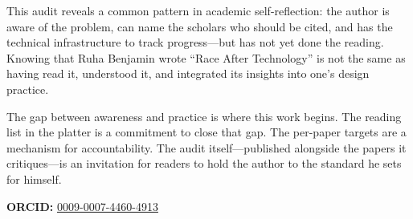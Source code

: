 \documentclass[10pt,letterpaper,twocolumn]{article}
\begin{document}
This audit reveals a common pattern in academic self-reflection: the author is aware of the problem, can name the scholars who should be cited, and has the technical infrastructure to track progress---but has not yet done the reading. Knowing that Ruha Benjamin wrote ``Race After Technology'' is not the same as having read it, understood it, and integrated its insights into one's design practice.

The gap between awareness and practice is where this work begins. The reading list in the platter is a commitment to close that gap. The per-paper targets are a mechanism for accountability. The audit itself---published alongside the papers it critiques---is an invitation for readers to hold the author to the standard he sets for himself.

\vspace{0.5em}
\noindent\textbf{ORCID:} \href{https://orcid.org/0009-0007-4460-4913}{0009-0007-4460-4913}




\end{document}
